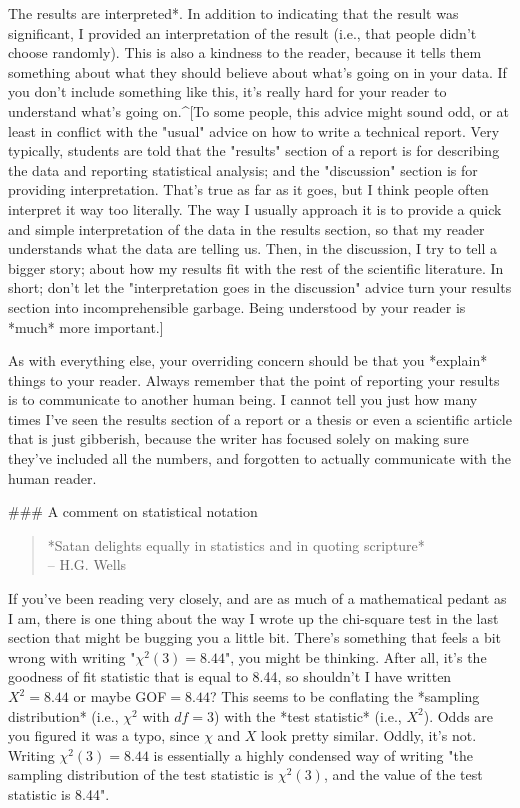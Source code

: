 \item *The results are interpreted*. In addition to indicating that the result was significant, I provided an interpretation of the result (i.e., that people didn't choose randomly). This is also a kindness to the reader, because it tells them something about what they should believe about what's going on in your data. If you don't include something like this, it's really hard for your reader to understand what's going on.^[To some people, this advice might sound odd, or at least in conflict with the "usual" advice on how to write a technical report. Very typically, students are told that the "results" section of a report is for describing the data and reporting statistical analysis; and the "discussion" section is for providing interpretation. That's true as far as it goes, but I think people often interpret it way too literally. The way I usually approach it is to provide a quick and simple interpretation of the data in the results section, so that my reader understands what the data are telling us. Then, in the discussion, I try to tell a bigger story; about how my results fit with the rest of the scientific literature. In short; don't let the "interpretation goes in the discussion" advice turn your results section into incomprehensible garbage. Being understood by your reader is *much* more important.]

As with everything else, your overriding concern should be that you *explain* things to your reader. Always remember that the point of reporting your results is to communicate to another human being. I cannot tell you just how many times I've seen the results section of a report or a thesis or even a scientific article that is just gibberish, because the writer has focused solely on making sure they've included all the numbers, and forgotten to actually communicate with the human reader. 

### A comment on statistical notation \advanced

\begin{quote}
*Satan delights equally in statistics and in quoting scripture* \\
\hspace*{2cm} -- H.G. Wells
\end{quote}


If you've been reading very closely, and are as much of a mathematical pedant as I am, there is one thing about the way I wrote up the chi-square test in the last section that might be bugging you a little bit. There's something that feels a bit wrong with writing "$\chi^2(3) = 8.44$", you might be thinking. After all, it's the goodness of fit statistic that is equal to 8.44, so shouldn't I have written $X^2 = 8.44$ or maybe GOF$=8.44$? This seems to be conflating the *sampling distribution* (i.e., $\chi^2$ with $df = 3$) with the *test statistic* (i.e., $X^2$). Odds are you figured it was a typo, since $\chi$ and $X$ look pretty similar. Oddly, it's not. Writing $\chi^2(3) = 8.44$ is essentially a highly condensed way of writing "the sampling distribution of the test statistic is $\chi^2(3)$, and the value of the test statistic is 8.44". 

